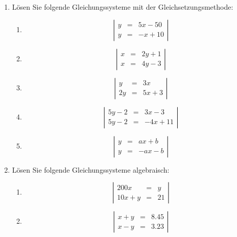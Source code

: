 \documentclass[%
11pt,%
twoside,%
titlepage,%
german,%
]{scrartcl}
\newenvironment{system}{\begin{displaymath}
  \left| 
    \begin{array}{rcl}}{\end{array} \right| 
\end{displaymath}}
\begin{document}
\begin{enumerate}
\item \label{aufg:linglsyst:gleichsetzung} L\"osen Sie folgende Gleichungssysteme mit der Gleichsetzungsmethode:
  \begin{enumerate}
  \item 
    \begin{system}
      y & = & 5x-50 \\
      y & = & -x+10
    \end{system}
  \item 
    \begin{system}
      x & = & 2y+1 \\
      x & = & 4y-3
    \end{system}
  \item 
    \begin{system}
      y & = & 3x \\
      2y & = & 5x+3
    \end{system}
  \item 
    \begin{system}
      5y-2 & = & 3x-3 \\
      5y-2 & = & -4x+11
    \end{system}
  \item 
    \begin{system}
      y & = & ax+b \\
      y & = & -ax-b
    \end{system}
  \end{enumerate}


\item L\"osen Sie folgende Gleichungssysteme algebraisch:
  \begin{enumerate}
  \item 
    \begin{displaymath}
      \left| 
        \begin{array}{rcl}
          200x & = & y \\
          10x+y & = & 21
        \end{array} \right|
    \end{displaymath}

  \item 
    \begin{displaymath}
      \left| 
        \begin{array}{rcl}
         x+y & = & 8.45 \\
         x-y & = & 3.23
        \end{array} \right|
    \end{displaymath}


\end{enumerate}
\end{enumerate}
\end{document}
